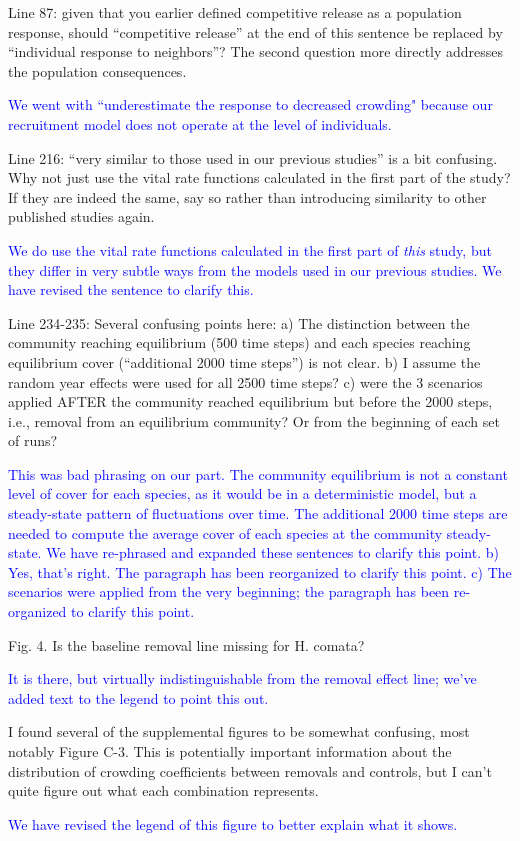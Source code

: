 \documentclass[12pt]{article}
\newcommand{\response}{\textcolor{blue}}
\begin{document}
Line 87: given that you earlier defined competitive release as a population response, should
“competitive release” at the end of this sentence be replaced by “individual response to neighbors”?
The second question more directly addresses the population consequences.

\response{We went with ``underestimate the response to decreased crowding" because our recruitment model does not operate 
at the level of individuals.}

Line 216: “very similar to those used in our previous studies” is a bit confusing. Why not just use the
vital rate functions calculated in the first part of the study? If they are indeed the same, say so rather
than introducing similarity to other published studies again.

\response{We do use the vital rate functions calculated in the first part of \emph{this} study, but they differ in very subtle ways 
from the models used in our previous studies. We have revised the sentence to clarify this.}

Line 234-235: Several confusing points here: a) The distinction between the community reaching
equilibrium (500 time steps) and each species reaching equilibrium cover (“additional 2000 time steps”)
is not clear. b) I assume the random year effects were used for all 2500 time steps? c) were the 3
scenarios applied AFTER the community reached equilibrium but before the 2000 steps, i.e., removal
from an equilibrium community? Or from the beginning of each set of runs?

\response{ This was bad phrasing on our part. 
The community equilibrium is not a constant level of cover for each species, as it would be in a deterministic
model, but a steady-state pattern of fluctuations over time. The additional 2000 time steps are needed to compute the average cover of each species
at the community steady-state. We have re-phrased and expanded these sentences to clarify this point. b) Yes, that's right. The paragraph
has been reorganized to clarify this point. c) The scenarios were applied from the very beginning; the paragraph has been re-organized to 
clarify this point.}

Fig. 4. Is the baseline removal line missing for H. comata?

\response{It is there, but virtually indistinguishable from the removal effect line; we've added text to the legend to point this out.}

I found several of the supplemental figures to be somewhat confusing, most notably Figure C-3. This is
potentially important information about the distribution of crowding coefficients between removals and
controls, but I can’t quite figure out what each combination represents.

\response{We have revised the legend of this figure to better explain what it shows.}
\end{document}
